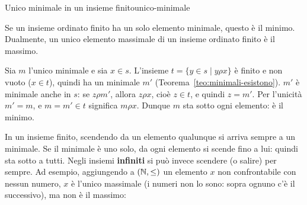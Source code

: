 \begin{concetto}
\begin{Proposizione}{Unico minimale in un insieme finito}{unico-minimale}
    \begin{prerequisiti}
    \end{prerequisiti}
    Se un insieme ordinato finito ha un solo elemento minimale, questo è il minimo. Dualmente, un unico elemento massimale di un
    insieme ordinato finito è il massimo.
\end{Proposizione}
\begin{dimostrazione}
    \facoltativa
    Sia $m$ l'unico minimale e sia $x \in s$. L'insieme $t = \{y \in s \mid y \rho x\}$ è finito e non vuoto ($x \in t$), quindi ha un minimale $m'$
    (Teorema~\ref{teo:minimali-esistono}). $m'$ è minimale anche in $s$: se $z \rho m'$, allora $z \rho x$, cioè $z \in t$, e quindi $z = m'$. Per l'unicità
    $m' = m$, e $m = m' \in t$ significa $m \rho x$. Dunque $m$ sta sotto ogni elemento: è il minimo.
\end{dimostrazione}
\end{concetto}

\begin{spiegazione}
    In un insieme finito, scendendo da un elemento qualunque si arriva sempre a un minimale. Se il minimale è uno solo, da ogni
    elemento si scende fino a lui: quindi sta sotto a tutti. Negli insiemi \textbf{infiniti} si può invece scendere (o salire) per sempre.
    Ad esempio, aggiungendo a $(\mathbb{N}, \leq)$ un elemento $x$ non confrontabile con nessun numero, $x$ è l'unico massimale (i numeri
    non lo sono: sopra ognuno c'è il successivo), ma non è il massimo:
    \begin{center}
    \end{center}
\end{spiegazione}

